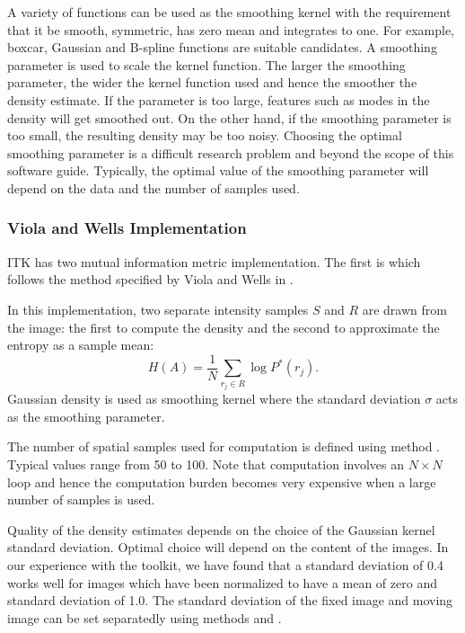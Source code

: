 A variety of functions can be used as the smoothing kernel with the
requirement that it be smooth, symmetric, has zero mean and
integrates to one. For example, boxcar, Gaussian and B-spline functions
are suitable candidates.
A smoothing parameter is used to scale the kernel function.
The larger the smoothing parameter, the wider the kernel function
used and hence the smoother the density estimate. If the parameter is
too large, features such as modes in the density will get smoothed out.
On the other hand, if the smoothing parameter is too small, the
resulting density may be too noisy. Choosing the optimal smoothing parameter 
is a difficult research 
problem and beyond the scope of this software guide.
Typically, the optimal value of the smoothing parameter will 
depend on the data and the number of samples used.

\subsubsection{Viola and Wells Implementation}
ITK has two mutual information metric implementation. The first is 
 which follows the method specified
by Viola and Wells in \cite{Viola1997}.


In this implementation, two separate intensity samples $S$ and $R$ are drawn
from the image: the first to compute the density and the second to approximate
the entropy as a sample mean:
\begin{equation}
H(A) = \frac{1}{N} \sum_{r_j \in R} \log P^{*}(r_j).
\end{equation}
Gaussian density is used as smoothing kernel where the standard deviation
$\sigma$ acts as the smoothing parameter.


The number of spatial samples used for computation is defined using
method . Typical values range from 50 to 100.
Note that computation involves an $N \times N$ loop and hence the computation
burden becomes very expensive when a large number of samples is used.

Quality of the density estimates depends on the choice of the Gaussian kernel
standard deviation. Optimal choice will depend on the content of the images.
In our experience with the toolkit, we have found that a standard deviation
of 0.4 works well for images which have been normalized to have a mean
of zero and standard deviation of 1.0. The standard deviation of the fixed image
and moving image can be set separatedly using methods 
 and .

